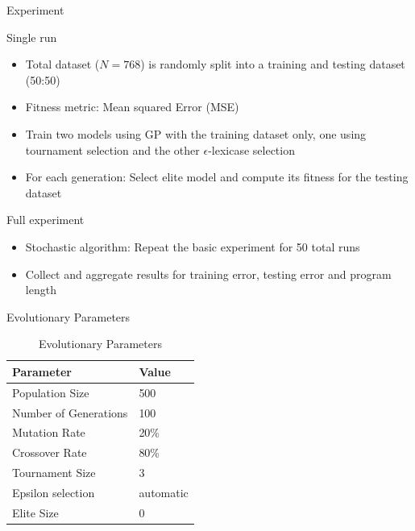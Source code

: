\documentclass[
  ignorenonframetext,
]{beamer}
\providecommand{\tightlist}{%
  \setlength{\itemsep}{0pt}\setlength{\parskip}{0pt}}
\begin{document}
\begin{frame}{Experiment}
\protect\hypertarget{experiment}{}
\begin{block}{Single run}
\protect\hypertarget{single-run}{}
\begin{itemize}
\tightlist
\item
  Total dataset (\(N=768\)) is randomly split into a training and
  testing dataset (50:50)
\item
  Fitness metric: Mean squared Error (MSE)
\item
  Train two models using GP with the training dataset only, one using
  tournament selection and the other \(\epsilon\)-lexicase selection
\item
  For each generation: Select elite model and compute its fitness for
  the testing dataset
\end{itemize}
\end{block}

\begin{block}{Full experiment}
\protect\hypertarget{full-experiment}{}
\begin{itemize}
\tightlist
\item
  Stochastic algorithm: Repeat the basic experiment for 50 total runs
\item
  Collect and aggregate results for training error, testing error and
  program length
\end{itemize}
\end{block}
\end{frame}

\begin{frame}{Evolutionary Parameters}
\protect\hypertarget{evolutionary-parameters}{}
\begin{table}[!h]

\caption{\label{tab:unnamed-chunk-2}Evolutionary Parameters}
\centering
\begin{tabular}[t]{l|l}
\hline
\textbf{Parameter} & \textbf{Value}\\
\hline
Population Size & 500\\
\hline
Number of Generations & 100\\
\hline
Mutation Rate & 20\%\\
\hline
Crossover Rate & 80\%\\
\hline
Tournament Size & 3\\
\hline
Epsilon selection & automatic\\
\hline
Elite Size & 0\\
\hline
\end{tabular}
\end{table}
\end{frame}
\end{document}
